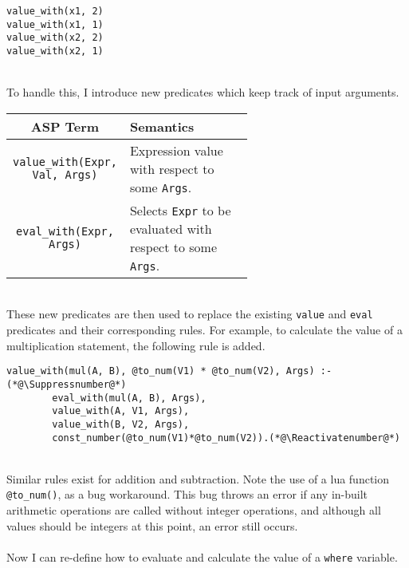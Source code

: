 \begin{lstlisting}
value_with(x1, 2)
value_with(x1, 1)
value_with(x2, 2)
value_with(x2, 1)
\end{lstlisting}
\mbox{}\\
To handle this, I introduce new predicates which keep track of input arguments.

\begin{center}
\begin{tabular}{| c | m{0.6\linewidth} |}
\hline
\textbf{ASP Term} & \textbf{Semantics} \\
\hline
\lstinline!value_with(Expr, Val, Args)! 
&
\mbox{}\newline
Expression value with respect to some \lstinline!Args!. \newline
\\
\hline
\lstinline!eval_with(Expr, Args)! 
&
\mbox{}\newline
Selects \lstinline!Expr! to be evaluated with respect to some \lstinline!Args!. \newline
\\
\hline
\end{tabular}
\end{center}
\mbox{}\\
These new predicates are then used to replace the existing \lstinline!value! and \lstinline!eval! predicates and their corresponding rules. For example, to calculate the value of a multiplication statement, the following rule is added.

\begin{lstlisting}[caption={Second attempt at multiplication}, label={lst:comp_mult}, firstnumber=57]
value_with(mul(A, B), @to_num(V1) * @to_num(V2), Args) :- (*@\Suppressnumber@*)
		eval_with(mul(A, B), Args), 
		value_with(A, V1, Args), 
		value_with(B, V2, Args), 
		const_number(@to_num(V1)*@to_num(V2)).(*@\Reactivatenumber@*)
\end{lstlisting}
\mbox{} \\
Similar rules exist for addition and subtraction. Note the use of a lua function \lstinline!@to_num()!, as a bug workaround. This bug throws an error if any in-built arithmetic operations are called without integer operations, and although all values should be integers at this point, an error still occurs. \\ \\
Now I can re-define how to evaluate and calculate the value of a \lstinline!where! variable. \\

